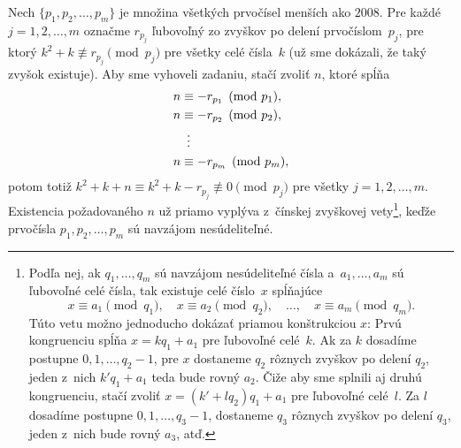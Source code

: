 {Nech $\{p_1,p_2,\dots,p_m\}$ je množina všetkých prvočísel menších ako $2008$. Pre každé $j=1,2,\dots,m$ označme $r_{p_j}$ ľubovoľný zo zvyškov po delení prvočíslom~$p_j$, pre ktorý $k^2+k \not\equiv r_{p_j}\pmod{p_j}$ pre všetky celé čísla~$k$ (už sme dokázali, že taký zvyšok existuje). Aby sme vyhoveli zadaniu, stačí zvoliť $n$, ktoré spĺňa
$$
\aligned
n&\equiv -r_{p_1}\pmod{p_1},\\
n&\equiv -r_{p_2}\pmod{p_2},\\
 &\ \,\vdots\\
n&\equiv -r_{p_m}\pmod{p_m},\\
\endaligned
$$
potom totiž $k^2+k+n\equiv k^2+k-r_{p_j}\not\equiv0\pmod{p_j}$ pre všetky $j=1,2,\dots,m$. Existencia požadovaného $n$ už priamo vyplýva z~čínskej zvyškovej vety\footnote{Podľa nej, ak $q_1,\dots,q_m$ sú navzájom nesúdeliteľné čísla a~$a_1,\dots,a_m$ sú ľubovoľné celé čísla, tak existuje celé číslo~$x$ spĺňajúce
$$
x\equiv a_1\pmod{q_1},\quad x\equiv a_2\pmod{q_2},\quad\dots,\quad x\equiv a_m\pmod {q_m}.
$$
Túto vetu možno jednoducho dokázať priamou konštrukciou $x$: Prvú kongruenciu spĺňa $x=kq_1+a_1$ pre ľubovoľné celé~$k$. Ak za $k$ dosadíme postupne $0,1,\dots,q_2-1$, pre $x$ dostaneme $q_2$ rôznych zvyškov po delení $q_2$, jeden z~nich $k'q_1+a_1$ teda bude rovný $a_2$. Čiže aby sme splnili aj druhú kongruenciu, stačí zvoliť $x=(k'+lq_2)q_1+a_1$ pre ľubovoľné celé~$l$. Za $l$ dosadíme postupne $0,1,\dots,q_3-1$, dostaneme $q_3$ rôznych zvyškov po delení $q_3$, jeden z~nich bude rovný $a_3$, atď.}, keďže prvočísla $p_1,p_2,\dots,p_m$ sú navzájom nesúdeliteľné.
}

